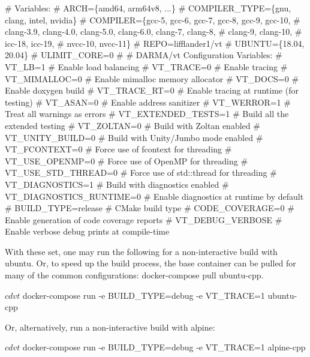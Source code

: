 \begin{DoxyCode}
# Variables:
#   ARCH=\{amd64, arm64v8, ...\}
#   COMPILER\_TYPE=\{gnu, clang, intel, nvidia\}
#   COMPILER=\{gcc-5, gcc-6, gcc-7, gcc-8, gcc-9, gcc-10,
#             clang-3.9, clang-4.0, clang-5.0, clang-6.0, clang-7, clang-8,
#             clang-9, clang-10,
#             icc-18, icc-19,
#             nvcc-10, nvcc-11\}
#   REPO=lifflander1/vt
#   UBUNTU=\{18.04, 20.04\}
#   ULIMIT\_CORE=0
#
# DARMA/vt Configuration Variables:
#   VT\_LB=1                   # Enable load balancing
#   VT\_TRACE=0                # Enable tracing
#   VT\_MIMALLOC=0             # Enable mimalloc memory allocator
#   VT\_DOCS=0                 # Enable doxygen build
#   VT\_TRACE\_RT=0             # Enable tracing at runtime (for testing)
#   VT\_ASAN=0                 # Enable address sanitizer
#   VT\_WERROR=1               # Treat all warnings as errors
#   VT\_EXTENDED\_TESTS=1       # Build all the extended testing
#   VT\_ZOLTAN=0               # Build with Zoltan enabled
#   VT\_UNITY\_BUILD=0          # Build with Unity/Jumbo mode enabled
#   VT\_FCONTEXT=0             # Force use of fcontext for threading
#   VT\_USE\_OPENMP=0           # Force use of OpenMP for threading
#   VT\_USE\_STD\_THREAD=0       # Force use of std::thread for threading
#   VT\_DIAGNOSTICS=1          # Build with diagnostics enabled
#   VT\_DIAGNOSTICS\_RUNTIME=0  # Enable diagnostics at runtime by default
#   BUILD\_TYPE=release        # CMake build type
#   CODE\_COVERAGE=0           # Enable generation of code coverage reports
#   VT\_DEBUG\_VERBOSE          # Enable verbose debug prints at compile-time
\end{DoxyCode}


With these set, one may run the following for a non-\/interactive build with ubuntu. Or, to speed up the build process, the base container can be pulled for many of the common configurations\+: {\ttfamily docker-\/compose pull ubuntu-\/cpp}.


\begin{DoxyCode}
$ cd vt
$ docker-compose run -e BUILD\_TYPE=debug -e VT\_TRACE=1 ubuntu-cpp
\end{DoxyCode}


Or, alternatively, run a non-\/interactive build with alpine\+:


\begin{DoxyCode}
$ cd vt
$ docker-compose run -e BUILD\_TYPE=debug -e VT\_TRACE=1 alpine-cpp
\end{DoxyCode}


